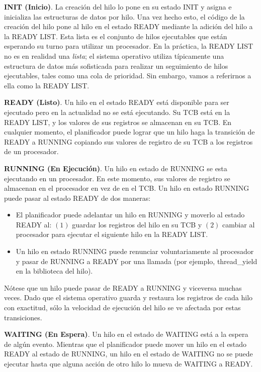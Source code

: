 \documentclass[10pt]{book}
\begin{document}
\textbf{INIT (Inicio)}. La creación del hilo lo pone en su estado INIT y asigna e inicializa las estructuras de datos por hilo. Una vez hecho esto, el código de la creación del hilo pone al hilo en el estado READY mediante la adición del hilo a la READY LIST. Esta lista es el conjunto de hilos ejecutables que están esperando su turno para utilizar un procesador. En la práctica, la READY LIST no es en realidad una \textit{lista}; el sistema operativo utiliza típicamente una estructura de datos más sofisticada para realizar un seguimiento de hilos ejecutables, tales como una cola de prioridad. Sin embargo, vamos a referirnos a ella como la READY LIST.

\textbf{READY (Listo)}. Un hilo en el estado READY está disponible para ser ejecutado pero en la actualidad no se está ejecutando. Su TCB está en la READY LIST, y los valores de sus registros se almacenan en su TCB. En cualquier momento, el planificador puede lograr que un hilo haga la transición de READY a RUNNING copiando sus valores de registro de su TCB a los registros de un procesador.

\textbf{RUNNING (En Ejecución)}. Un hilo en estado de RUNNING se esta ejecutando en un procesador. En este momento, sus valores de registro se almacenan en el procesador en vez de en el TCB. Un hilo en estado RUNNING puede pasar al estado READY de dos maneras:
\begin{itemize}
\item El planificador puede adelantar un hilo en RUNNING y moverlo al estado READY al: $(1)$ guardar los registros del hilo en su TCB y $(2)$ cambiar al procesador para ejecutar el siguiente hilo en la READY LIST.
\item Un hilo en estado RUNNING puede renunciar voluntariamente al procesador y pasar de RUNNING a READY por una llamada (por ejemplo, {\mf thread\_yield} en la biblioteca del hilo).
\end{itemize}

Nótese que un hilo puede pasar de READY a RUNNING y viceversa muchas veces. Dado que el sistema operativo guarda y restaura los registros de cada hilo con exactitud, sólo la velocidad de ejecución del hilo se ve afectada por estas transiciones.

\textbf{WAITING (En Espera)}. Un hilo en el estado de WAITING está a la espera de algún evento. Mientras que el planificador puede mover un hilo en el estado READY al estado de RUNNING, un hilo en el estado de WAITING no se puede ejecutar hasta que alguna acción de otro hilo lo mueva de WAITING a READY.
\end{document}
